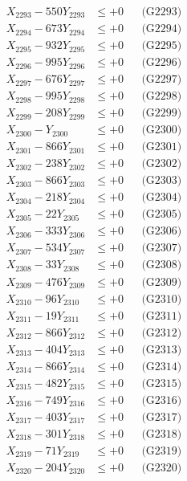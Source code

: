 \documentclass[a4paper,10pt]{article}
\begin{document}
{\begin{align}
X_{2293} - 550Y_{2293} &\leq +0 && \text{(G2293)} \\
X_{2294} - 673Y_{2294} &\leq +0 && \text{(G2294)} \\
X_{2295} - 932Y_{2295} &\leq +0 && \text{(G2295)} \\
X_{2296} - 995Y_{2296} &\leq +0 && \text{(G2296)} \\
X_{2297} - 676Y_{2297} &\leq +0 && \text{(G2297)} \\
X_{2298} - 995Y_{2298} &\leq +0 && \text{(G2298)} \\
X_{2299} - 208Y_{2299} &\leq +0 && \text{(G2299)} \\
X_{2300} - Y_{2300} &\leq +0 && \text{(G2300)} \\
\allowbreak
X_{2301} - 866Y_{2301} &\leq +0 && \text{(G2301)} \\
X_{2302} - 238Y_{2302} &\leq +0 && \text{(G2302)} \\
X_{2303} - 866Y_{2303} &\leq +0 && \text{(G2303)} \\
X_{2304} - 218Y_{2304} &\leq +0 && \text{(G2304)} \\
X_{2305} - 22Y_{2305} &\leq +0 && \text{(G2305)} \\
X_{2306} - 333Y_{2306} &\leq +0 && \text{(G2306)} \\
X_{2307} - 534Y_{2307} &\leq +0 && \text{(G2307)} \\
X_{2308} - 33Y_{2308} &\leq +0 && \text{(G2308)} \\
X_{2309} - 476Y_{2309} &\leq +0 && \text{(G2309)} \\
X_{2310} - 96Y_{2310} &\leq +0 && \text{(G2310)} \\
\allowbreak
X_{2311} - 19Y_{2311} &\leq +0 && \text{(G2311)} \\
X_{2312} - 866Y_{2312} &\leq +0 && \text{(G2312)} \\
X_{2313} - 404Y_{2313} &\leq +0 && \text{(G2313)} \\
X_{2314} - 866Y_{2314} &\leq +0 && \text{(G2314)} \\
X_{2315} - 482Y_{2315} &\leq +0 && \text{(G2315)} \\
X_{2316} - 749Y_{2316} &\leq +0 && \text{(G2316)} \\
X_{2317} - 403Y_{2317} &\leq +0 && \text{(G2317)} \\
X_{2318} - 301Y_{2318} &\leq +0 && \text{(G2318)} \\
X_{2319} - 71Y_{2319} &\leq +0 && \text{(G2319)} \\
X_{2320} - 204Y_{2320} &\leq +0 && \text{(G2320)} \\

\end{align}}
\end{document}
